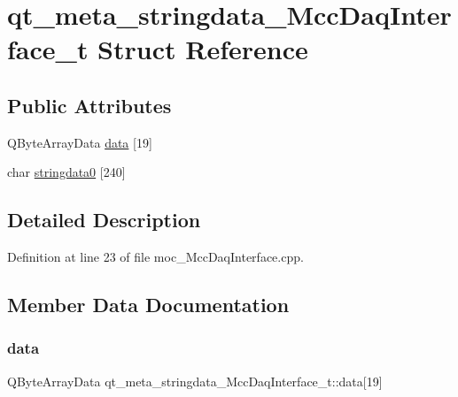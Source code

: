\hypertarget{structqt__meta__stringdata___mcc_daq_interface__t}{}\section{qt\+\_\+meta\+\_\+stringdata\+\_\+\+Mcc\+Daq\+Interface\+\_\+t Struct Reference}
\label{structqt__meta__stringdata___mcc_daq_interface__t}
\subsection*{Public Attributes}
\begin{DoxyCompactItemize}
\item 
Q\+Byte\+Array\+Data \hyperlink{structqt__meta__stringdata___mcc_daq_interface__t_a7a6d22e8f1055d6e565eba3a5d552655}{data} \mbox{[}19\mbox{]}
\item 
char \hyperlink{structqt__meta__stringdata___mcc_daq_interface__t_a43702ce5256ac3912ebfe978a62ff642}{stringdata0} \mbox{[}240\mbox{]}
\end{DoxyCompactItemize}


\subsection{Detailed Description}


Definition at line 23 of file moc\+\_\+\+Mcc\+Daq\+Interface.\+cpp.



\subsection{Member Data Documentation}
\mbox{\label{structqt__meta__stringdata___mcc_daq_interface__t_a7a6d22e8f1055d6e565eba3a5d552655}} 
\subsubsection{\texorpdfstring{data}{data}}
{\footnotesize\ttfamily Q\+Byte\+Array\+Data qt\+\_\+meta\+\_\+stringdata\+\_\+\+Mcc\+Daq\+Interface\+\_\+t\+::data\mbox{[}19\mbox{]}}



